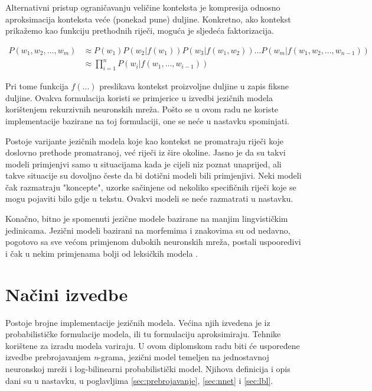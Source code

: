 \documentclass[times, utf8, diplomski, numeric]{fer}
\begin{document}
Alternativni pristup ograničavanju veličine konteksta je kompresija odnosno aproksimacija konteksta veće (ponekad pune) duljine. Konkretno, ako kontekst prikažemo kao funkciju prethodnih riječi, moguća je sljedeća faktorizacija.

\begin{align*}
P(w_1, w_2, ... , w_m)
  &\approx P(w_1) P(w_2 | f(w_1)) P(w_3 | f(w_1, w_2)) ... P(w_m | f(w_1, w_2, ... , w_{n - 1 })) \\
  &\approx \prod_{i = 1}^n{P(w_i | f(w_1, ... , w_{i - 1}))}
\end{align*}

Pri tome funkcija $f(...)$ preslikava kontekst proizvoljne duljine u zapis fiksne duljine. Ovakva formulacija koristi se primjerice u izvedbi jezičnih modela korištenjem rekurzivnih neuronskih mreža. Pošto se u ovom radu ne koriste implementacije bazirane na toj formulaciji, one se neće u nastavku spominjati.

Postoje varijante jezičnih modela koje kao kontekst ne promatraju riječi koje doslovno prethode promatranoj, već riječi iz šire okoline. Jasno je da su takvi modeli primjenjvi samo u situacijama kada je cijeli niz poznat unaprijed, ali takve situacije su dovoljno česte da bi dotični modeli bili primjenjivi. Neki modeli čak razmatraju "koncepte", uzorke sačinjene od nekoliko specifičnih riječi koje se mogu pojaviti bilo gdje u tekstu. Ovakvi modeli se neće razmatrati u nastavku.

Konačno, bitno je spomenuti jezične modele bazirane na manjim lingvističkim jedinicama. Jezični modeli bazirani na morfemima i znakovima su od nedavno, pogotovo sa sve većom primjenom dubokih neuronskih mreža, postali uspooredivi i čak u nekim primjenama bolji od leksičkih modela \cite{ZhangL15}.

\section{Načini izvedbe}

Postoje brojne implementacije jezičnih modela. Većina njih izvedena je iz probabilističke formulacije modela, ili tu formulaciju aproksimiraju. Tehnike korištene za izradu modela variraju. U ovom diplomskom radu biti će uspoređene izvedbe prebrojavanjem \textit{n}-grama, jezični model temeljen na jednostavnoj neuronskoj mreži i log-bilinearni probabilistički model. Njihova definicija i opis dani su u nastavku, u poglavljima \ref{sec:prebrojavanje}, \ref{sec:nnet} i \ref{sec:lbl}.
\end{document}
